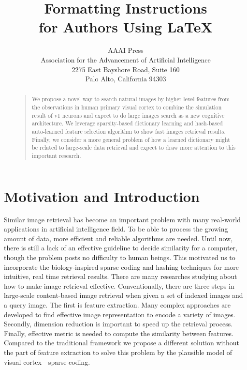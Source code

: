 \documentclass[letterpaper]{article}
\begin{document}
%
\title{Formatting Instructions \\for Authors Using \LaTeX{}}
\author{AAAI Press\\
Association for the Advancement of Artificial Intelligence\\
2275 East Bayshore Road, Suite 160\\
Palo Alto, California 94303\\
}
\maketitle
\begin{abstract}
\begin{quote}
We propose a novel way to search natural images by higher-level features from the observations in human primary visual cortex to combine the simulation result of v1 neurons and expect to do large images search as a new cognitive architecture. We leverage sparsity-based dictionary learning and hash-based auto-learned feature selection algorithm to show fast images retrieval results. Finally, we consider a more general problem of how a learned dictionary might be related to large-scale data retrieval and expect to draw more attention to this important research.
\end{quote}
\end{abstract}

\section{Motivation and Introduction}
Similar image retrieval has become an important problem with many real-world applications in artificial intelligence field. To be able to process the growing amount of data, more efficient and reliable algorithms are needed. Until now, there is still a lack of an effective guideline to decide similarity for a computer, though the problem posts no difficulty to human beings. This motivated us to incorporate the biology-inspired sparse coding and hashing techniques for more intuitive, real time retrieval results.
There are many researches studying about how to make image retrieval effective. Conventionally, there are three steps in large-scale content-based image retrieval when given a set of indexed images and a query image. The first is feature extraction. Many complex approaches are developed to find effective image representation to encode a variety of images. Secondly, dimension reduction is important to speed up the retrieval process. Finally, effective metric is needed to compute the similarity between features. Compared to the traditional framework we propose a different solution without the part of feature extraction to solve this problem by the plausible model of visual cortex—sparse coding.
\end{document}
